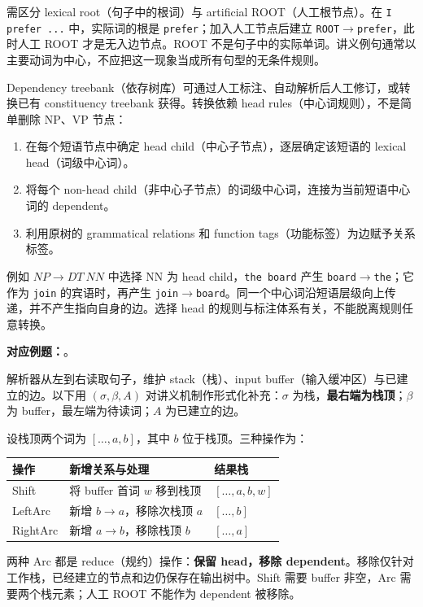 需区分 lexical root（句子中的根词）与 artificial ROOT（人工根节点）。在 \texttt{I prefer ...} 中，实际词的根是 \texttt{prefer}；加入人工节点后建立 \texttt{ROOT}$\rightarrow$\texttt{prefer}，此时人工 ROOT 才是无入边节点。ROOT 不是句子中的实际单词。讲义例句通常以主要动词为中心，不应把这一现象当成所有句型的无条件规则。


Dependency treebank（依存树库）可通过人工标注、自动解析后人工修订，或转换已有 constituency treebank 获得。转换依赖 head rules（中心词规则），不是简单删除 NP、VP 节点：
\begin{enumerate}
  \item 在每个短语节点中确定 head child（中心子节点），逐层确定该短语的 lexical head（词级中心词）。
  \item 将每个 non-head child（非中心子节点）的词级中心词，连接为当前短语中心词的 dependent。
  \item 利用原树的 grammatical relations 和 function tags（功能标签）为边赋予关系标签。
\end{enumerate}
例如 $NP\rightarrow DT\ NN$ 中选择 NN 为 head child，\texttt{the board} 产生 \texttt{board}$\rightarrow$\texttt{the}；它作为 \texttt{join} 的宾语时，再产生 \texttt{join}$\rightarrow$\texttt{board}。同一个中心词沿短语层级向上传递，并不产生指向自身的边。选择 head 的规则与标注体系有关，不能脱离规则任意转换。

\textbf{对应例题：}。


解析器从左到右读取句子，维护 stack（栈）、input buffer（输入缓冲区）与已建立的边。以下用 $(\sigma,\beta,A)$ 对讲义机制作形式化补充：$\sigma$ 为栈，\textbf{最右端为栈顶}；$\beta$ 为 buffer，最左端为待读词；$A$ 为已建立的边。

设栈顶两个词为 $[\ldots,a,b]$，其中 $b$ 位于栈顶。三种操作为：
\begin{center}
\begin{tabularx}{\textwidth}{@{}l X l@{}}
\toprule
操作 & 新增关系与处理 & 结果栈 \\
\midrule
Shift & 将 buffer 首词 $w$ 移到栈顶 & $[\ldots,a,b,w]$ \\
LeftArc & 新增 $b\rightarrow a$，移除次栈顶 $a$ & $[\ldots,b]$ \\
RightArc & 新增 $a\rightarrow b$，移除栈顶 $b$ & $[\ldots,a]$ \\
\bottomrule
\end{tabularx}
\end{center}
两种 Arc 都是 reduce（规约）操作：\textbf{保留 head，移除 dependent}。移除仅针对工作栈，已经建立的节点和边仍保存在输出树中。Shift 需要 buffer 非空，Arc 需要两个栈元素；人工 ROOT 不能作为 dependent 被移除。

